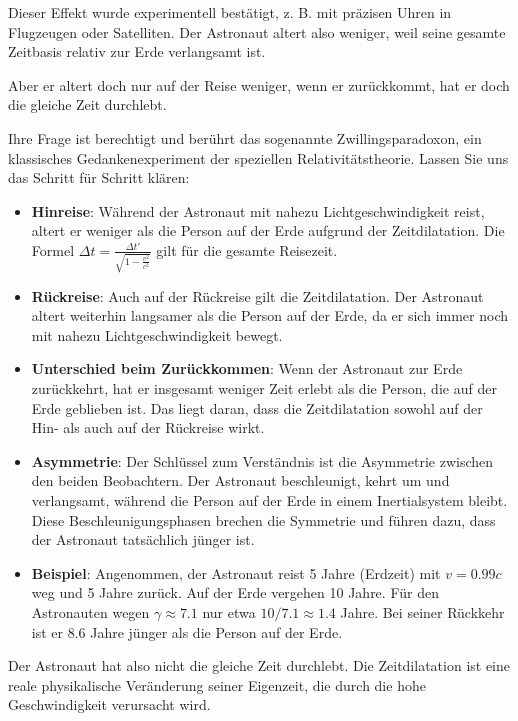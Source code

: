 \documentclass[a4paper,12pt]{article}
\begin{document}
	Dieser Effekt wurde experimentell bestätigt, z. B. mit präzisen Uhren in Flugzeugen oder Satelliten. Der Astronaut altert also weniger, weil seine gesamte Zeitbasis relativ zur Erde verlangsamt ist.
	
	Aber er altert doch nur auf der Reise weniger, wenn er zurückkommt, hat er doch die gleiche Zeit durchlebt.
	
	Ihre Frage ist berechtigt und berührt das sogenannte Zwillingsparadoxon, ein klassisches Gedankenexperiment der speziellen Relativitätstheorie. Lassen Sie uns das Schritt für Schritt klären:
	
	\begin{itemize}
		\item \textbf{Hinreise}: Während der Astronaut mit nahezu Lichtgeschwindigkeit reist, altert er weniger als die Person auf der Erde aufgrund der Zeitdilatation. Die Formel \( \Delta t = \frac{\Delta t'}{\sqrt{1 - \frac{v^2}{c^2}}} \) gilt für die gesamte Reisezeit.
		\item \textbf{Rückreise}: Auch auf der Rückreise gilt die Zeitdilatation. Der Astronaut altert weiterhin langsamer als die Person auf der Erde, da er sich immer noch mit nahezu Lichtgeschwindigkeit bewegt.
		\item \textbf{Unterschied beim Zurückkommen}: Wenn der Astronaut zur Erde zurückkehrt, hat er insgesamt weniger Zeit erlebt als die Person, die auf der Erde geblieben ist. Das liegt daran, dass die Zeitdilatation sowohl auf der Hin- als auch auf der Rückreise wirkt.
		\item \textbf{Asymmetrie}: Der Schlüssel zum Verständnis ist die Asymmetrie zwischen den beiden Beobachtern. Der Astronaut beschleunigt, kehrt um und verlangsamt, während die Person auf der Erde in einem Inertialsystem bleibt. Diese Beschleunigungsphasen brechen die Symmetrie und führen dazu, dass der Astronaut tatsächlich jünger ist.
		\item \textbf{Beispiel}: Angenommen, der Astronaut reist 5 Jahre (Erdzeit) mit \( v = 0.99c \) weg und 5 Jahre zurück. Auf der Erde vergehen 10 Jahre. Für den Astronauten wegen \( \gamma \approx 7.1 \) nur etwa \( 10 / 7.1 \approx 1.4 \) Jahre. Bei seiner Rückkehr ist er 8.6 Jahre jünger als die Person auf der Erde.
	\end{itemize}
	
	Der Astronaut hat also nicht die gleiche Zeit durchlebt. Die Zeitdilatation ist eine reale physikalische Veränderung seiner Eigenzeit, die durch die hohe Geschwindigkeit verursacht wird.
	
\end{document}
